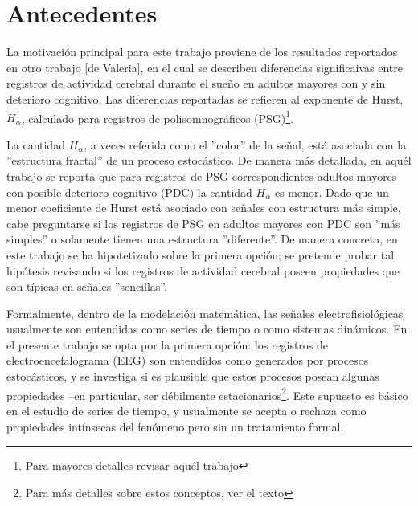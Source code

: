 \documentclass[12pt,a4paper]{mitthesis}
\begin{document}
\chapter{Antecedentes}

La motivaci\'on principal para este trabajo proviene de los resultados reportados en otro trabajo 
[de Valeria], en el cual se describen diferencias significaivas entre registros de actividad
cerebral durante el sue\~no en adultos mayores con y sin deterioro cognitivo. Las diferencias 
reportadas se refieren al exponente de Hurst, $H_\alpha$, calculado para registros de
polisomnogr\'aficos (PSG)\footnote{Para mayores detalles revisar aqu\'el trabajo}.

La cantidad $H_\alpha$, a veces referida como el ''color'' de la se\~nal, est\'a asociada con la
''estructura fractal'' de un proceso estoc\'astico. De manera m\'as detallada, en aqu\'el trabajo 
se reporta que para registros de PSG correspondientes adultos mayores con posible deterioro
cognitivo (PDC) la cantidad $H_\alpha$ es menor. Dado que un menor coeficiente de Hurst est\'a 
asociado con se\~nales con estructura m\'as simple, cabe preguntarse si los registros de PSG en 
adultos mayores con PDC son ''m\'as simples'' o solamente tienen una estructura ''diferente''. De 
manera concreta, en este trabajo se ha hipotetizado sobre la primera opci\'on; se pretende probar
tal hip\'otesis revisando si los registros de actividad cerebral poseen propiedades que son
t\'ipicas en se\~nales ''sencillas''.

Formalmente, dentro de la modelaci\'on matem\'atica, las se\~nales electrofisiol\'ogicas usualmente 
son entendidas como series de tiempo o como sistemas din\'amicos.
En el presente trabajo se opta por la primera opci\'on: los registros de electroencefalograma (EEG)
son entendidos como generados por procesos estoc\'asticos, y se investiga si es plausible que estos
procesos posean algunas propiedades --en particular, ser d\'ebilmente estacionarios\footnote{Para
m\'as detalles sobre estos conceptos, ver el texto}.
Este supuesto es b\'asico en el estudio de series de tiempo, y usualmente se acepta o rechaza como 
propiedades int\'insecas del fen\'omeno pero sin un tratamiento formal.
\end{document}
